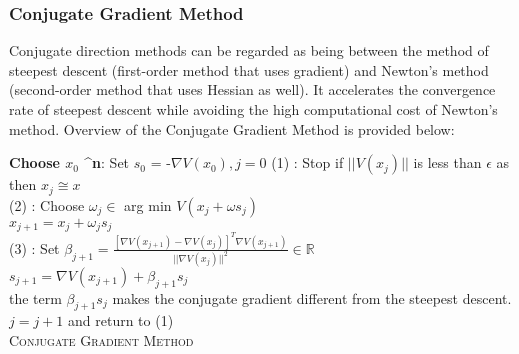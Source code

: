 \subsubsection{Conjugate Gradient Method}
Conjugate direction methods can be regarded as being between the method of steepest descent (first-order method that uses gradient) and Newton’s method (second-order method that uses Hessian as well). It accelerates the convergence rate of steepest descent while avoiding the high computational cost of Newton’s method. Overview of the Conjugate Gradient Method is provided below:   
\SetAlgoLined
\DontPrintSemicolon
\begin{algorithm}[H]
   \textbf{Choose $x_{0}$ \in {}^{n}}: \newline
   Set\hspace{2mm} $s_{0}$ = -$\nabla V(x_{0}), j = 0$ \newline 
   (1) : Stop if $||V(x_{j})||$ is less than $\epsilon$ as then $x_{j} \cong x$ \\
   (2) : Choose $\omega_{j} \in$ arg min $V(x_{j} + \omega s_{j})$ \\
   $x_{j+1} = x_{j} + \omega_{j}s_{j}$\\
   (3) : Set $\beta_{j+1} = \frac{[\nabla V(x_{j+1}) - \nabla V(x_{j})]^{T}\nabla V(x_{j+1})}{||\nabla V(x_{j})||^{2}} \in \mathbb{R}$\\
   $s_{j+1} = \nabla V(x_{j+1}) + \beta_{j+1}s_{j}$\\
   the term $\beta_{j+1}s_{j}$ makes the conjugate gradient different from the steepest descent. \\
   $j = j + 1$ and return to (1) \\
  \caption{\textsc{Conjugate Gradient Method}}
\end{algorithm}

